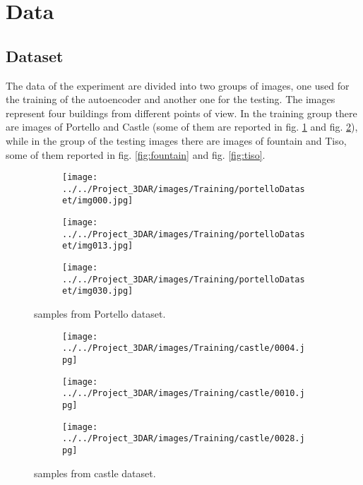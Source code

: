 
\section{Data}
\subsection{Dataset}
The data of the experiment are divided into two groups of images, one used for the training of the autoencoder and another one for the testing. The images represent four buildings from different points of view. In the training group there are images of Portello and Castle (some of them are reported in fig. \ref{fig:portello} and fig. \ref{fig:castle}), while in the group of the testing images there are images of fountain and Tiso, some of them reported in fig. \ref{fig:fountain} and fig. \ref{fig:tiso}.

\begin{figure}[H]
     \centering
     \begin{subfigure}[b]{0.3\textwidth}
         \centering
         \texttt{[image: ../../Project\_3DAR/images/Training/portelloDataset/img000.jpg]}
     \end{subfigure}
     \hfill
     \begin{subfigure}[b]{0.3\textwidth}
         \centering
         \texttt{[image: ../../Project\_3DAR/images/Training/portelloDataset/img013.jpg]}
     \end{subfigure}
     \hfill
     \begin{subfigure}[b]{0.3\textwidth}
         \centering
         \texttt{[image: ../../Project\_3DAR/images/Training/portelloDataset/img030.jpg]}
     \end{subfigure}
        \caption{samples from Portello dataset.}
        \label{fig:portello}
\end{figure}

\begin{figure}[H]
     \centering
     \begin{subfigure}[b]{0.3\textwidth}
         \centering
         \texttt{[image: ../../Project\_3DAR/images/Training/castle/0004.jpg]}
     \end{subfigure}
     \hfill
     \begin{subfigure}[b]{0.3\textwidth}
         \centering
         \texttt{[image: ../../Project\_3DAR/images/Training/castle/0010.jpg]}
     \end{subfigure}
     \hfill
     \begin{subfigure}[b]{0.3\textwidth}
         \centering
         \texttt{[image: ../../Project\_3DAR/images/Training/castle/0028.jpg]}
     \end{subfigure}
        \caption{samples from castle dataset.}
        \label{fig:castle}
\end{figure}

